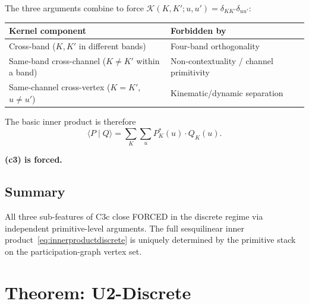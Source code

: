 \documentclass[11pt,a4paper]{article}
\begin{document}
The three arguments combine to force $\mathcal{K}(K, K'; u, u') = \delta_{KK'} \delta_{uu'}$:

\begin{center}
\begin{tabular}{ll}
\hline
Kernel component & Forbidden by \\
\hline
Cross-band ($K, K'$ in different bands) & Four-band orthogonality \\
Same-band cross-channel ($K \neq K'$ within a band) & Non-contextuality / channel primitivity \\
Same-channel cross-vertex ($K = K'$, $u \neq u'$) & Kinematic/dynamic separation \\
\hline
\end{tabular}
\end{center}

The basic inner product is therefore
\begin{equation}
\langle P \mid Q \rangle = \sum_K \sum_u P_K^*(u) \cdot Q_K(u).
\label{eq:innerproductdiscrete}
\end{equation}

\textbf{(c3) is forced.}

\subsection{Summary}

All three sub-features of C3c close FORCED in the discrete regime via independent primitive-level arguments. The full sesquilinear inner product~\eqref{eq:innerproductdiscrete} is uniquely determined by the primitive stack on the participation-graph vertex set.

\section{Theorem: U2-Discrete}\label{sec:thmdiscrete}
\end{document}
